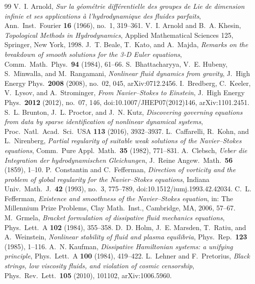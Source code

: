 \documentclass[11pt]{amsart}
\theoremstyle{definition}
\theoremstyle{remark}
\begin{document}
\begin{thebibliography}{99}
 V.~I. Arnold, \emph{Sur la g\'eom\'etrie diff\'erentielle des groupes de Lie de dimension infinie et ses applications \`a l'hydrodynamique des fluides parfaits}, Ann.\ Inst.\ Fourier \textbf{16} (1966), no.~1, 319--361.
 V.~I. Arnold and B.~A. Khesin, \emph{Topological Methods in Hydrodynamics}, Applied Mathematical Sciences 125, Springer, New York, 1998.
 J.~T. Beale, T.~Kato, and A.~Majda, \emph{Remarks on the breakdown of smooth solutions for the 3-D Euler equations}, Comm.\ Math.\ Phys.\ \textbf{94} (1984), 61--66.
 S.~Bhattacharyya, V.~E. Hubeny, S.~Minwalla, and M.~Rangamani, \emph{Nonlinear fluid dynamics from gravity}, J.\ High Energy Phys.\ \textbf{2008} (2008), no.~02, 045, arXiv:0712.2456.
 I.~Bredberg, C.~Keeler, V.~Lysov, and A.~Strominger, \emph{From Navier--Stokes to Einstein}, J.\ High Energy Phys.\ \textbf{2012} (2012), no.~07, 146, doi:10.1007/JHEP07(2012)146, arXiv:1101.2451.
 S.~L. Brunton, J.~L. Proctor, and J.~N. Kutz, \emph{Discovering governing equations from data by sparse identification of nonlinear dynamical systems}, Proc.\ Natl.\ Acad.\ Sci.\ USA \textbf{113} (2016), 3932--3937.
 L.~Caffarelli, R.~Kohn, and L.~Nirenberg, \emph{Partial regularity of suitable weak solutions of the Navier--Stokes equations}, Comm.\ Pure Appl.\ Math.\ \textbf{35} (1982), 771--831.
 A.~Clebsch, \emph{Ueber die Integration der hydrodynamischen Gleichungen}, J.\ Reine Angew.\ Math.\ \textbf{56} (1859), 1--10.
 P.~Constantin and C.~Fefferman, \emph{Direction of vorticity and the problem of global regularity for the Navier--Stokes equations}, Indiana Univ.\ Math.\ J.\ \textbf{42} (1993), no.~3, 775--789, doi:10.1512/iumj.1993.42.42034.
 C.~L. Fefferman, \emph{Existence and smoothness of the Navier--Stokes equation}, in: The Millennium Prize Problems, Clay Math.\ Inst., Cambridge, MA, 2006, 57--67.
 M.~Grmela, \emph{Bracket formulation of dissipative fluid mechanics equations}, Phys.\ Lett.\ A \textbf{102} (1984), 355--358.
 D.~D. Holm, J.~E. Marsden, T.~Ratiu, and A.~Weinstein, \emph{Nonlinear stability of fluid and plasma equilibria}, Phys.\ Rep.\ \textbf{123} (1985), 1--116.
 A.~N. Kaufman, \emph{Dissipative Hamiltonian systems: a unifying principle}, Phys.\ Lett.\ A \textbf{100} (1984), 419--422.
 L.~Lehner and F.~Pretorius, \emph{Black strings, low viscosity fluids, and violation of cosmic censorship}, Phys.\ Rev.\ Lett.\ \textbf{105} (2010), 101102, arXiv:1006.5960.

\end{thebibliography}
\end{document}

